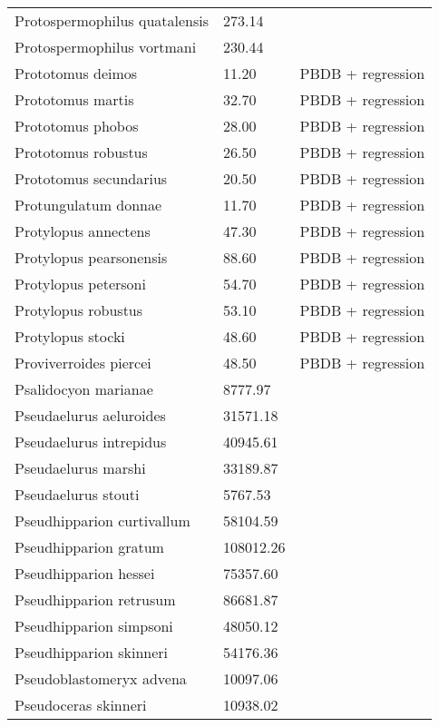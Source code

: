 \begin{longtable}{p{} p{} p{}}
    Protospermophilus quatalensis & 273.14 & \cite{Tomiya2013} \\ 
    Protospermophilus vortmani & 230.44 & \cite{Tomiya2013} \\ 
    Prototomus deimos & 11.20 & PBDB + regression \\ 
    Prototomus martis & 32.70 & PBDB + regression \\ 
    Prototomus phobos & 28.00 & PBDB + regression \\ 
    Prototomus robustus & 26.50 & PBDB + regression \\ 
    Prototomus secundarius & 20.50 & PBDB + regression \\ 
    Protungulatum donnae & 11.70 & PBDB + regression \\ 
    Protylopus annectens & 47.30 & PBDB + regression \\ 
    Protylopus pearsonensis & 88.60 & PBDB + regression \\ 
    Protylopus petersoni & 54.70 & PBDB + regression \\ 
    Protylopus robustus & 53.10 & PBDB + regression \\ 
    Protylopus stocki & 48.60 & PBDB + regression \\ 
    Proviverroides piercei & 48.50 & PBDB + regression \\ 
    Psalidocyon marianae & 8777.97 & \cite{Tomiya2013} \\ 
    Pseudaelurus aeluroides & 31571.18 & \cite{Tomiya2013} \\ 
    Pseudaelurus intrepidus & 40945.61 & \cite{Tomiya2013} \\ 
    Pseudaelurus marshi & 33189.87 & \cite{Tomiya2013} \\ 
    Pseudaelurus stouti & 5767.53 & \cite{Tomiya2013} \\ 
    Pseudhipparion curtivallum & 58104.59 & \cite{Tomiya2013} \\ 
    Pseudhipparion gratum & 108012.26 & \cite{Tomiya2013} \\ 
    Pseudhipparion hessei & 75357.60 & \cite{Tomiya2013} \\ 
    Pseudhipparion retrusum & 86681.87 & \cite{Tomiya2013} \\ 
    Pseudhipparion simpsoni & 48050.12 & \cite{Tomiya2013} \\ 
    Pseudhipparion skinneri & 54176.36 & \cite{Tomiya2013} \\ 
    Pseudoblastomeryx advena & 10097.06 & \cite{Tomiya2013} \\ 
    Pseudoceras skinneri & 10938.02 & \cite{Tomiya2013} \\ 

\end{longtable}
